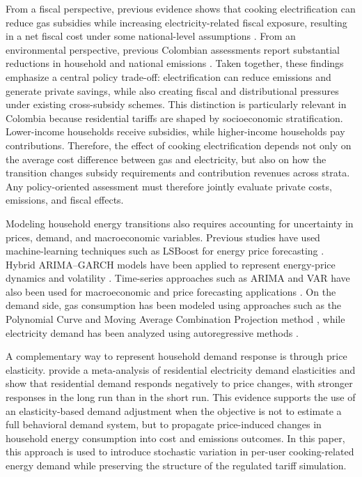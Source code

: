 \documentclass[authoryear,preprint,review,10pt]{elsarticle}
\begin{document}
From a fiscal perspective, previous evidence shows that cooking electrification can reduce gas subsidies while increasing electricity-related fiscal exposure, resulting in a net fiscal cost under some national-level assumptions \citep{cabrales2023costos}. From an environmental perspective, previous Colombian assessments report substantial reductions in household and national emissions \citep{cabrales2025subsidios_gas}. Taken together, these findings emphasize a central policy trade-off: electrification can reduce emissions and generate private savings, while also creating fiscal and distributional pressures under existing cross-subsidy schemes. This distinction is particularly relevant in Colombia because residential tariffs are shaped by socioeconomic stratification. Lower-income households receive subsidies, while higher-income households pay contributions. Therefore, the effect of cooking electrification depends not only on the average cost difference between gas and electricity, but also on how the transition changes subsidy requirements and contribution revenues across strata. Any policy-oriented assessment must therefore jointly evaluate private costs, emissions, and fiscal effects.

Modeling household energy transitions also requires accounting for uncertainty in prices, demand, and macroeconomic variables. Previous studies have used machine-learning techniques such as LSBoost for energy price forecasting \citep{su2019data}. Hybrid ARIMA--GARCH models have been applied to represent energy-price dynamics and volatility \citep{tan2010day}. Time-series approaches such as ARIMA and VAR have also been used for macroeconomic and price forecasting applications \citep{khamis2020,rosales2017,babu2015}. On the demand side, gas consumption has been modeled using approaches such as the Polynomial Curve and Moving Average Combination Projection method \citep{xu2010forecasting}, while electricity demand has been analyzed using autoregressive methods \citep{saab2001univariate}. 

A complementary way to represent household demand response is through price elasticity. \citet{espey2004turning} provide a meta-analysis of residential electricity demand elasticities and show that residential demand responds negatively to price changes, with stronger responses in the long run than in the short run. This evidence supports the use of an elasticity-based demand adjustment when the objective is not to estimate a full behavioral demand system, but to propagate price-induced changes in household energy consumption into cost and emissions outcomes. In this paper, this approach is used to introduce stochastic variation in per-user cooking-related energy demand while preserving the structure of the regulated tariff simulation.
\end{document}
